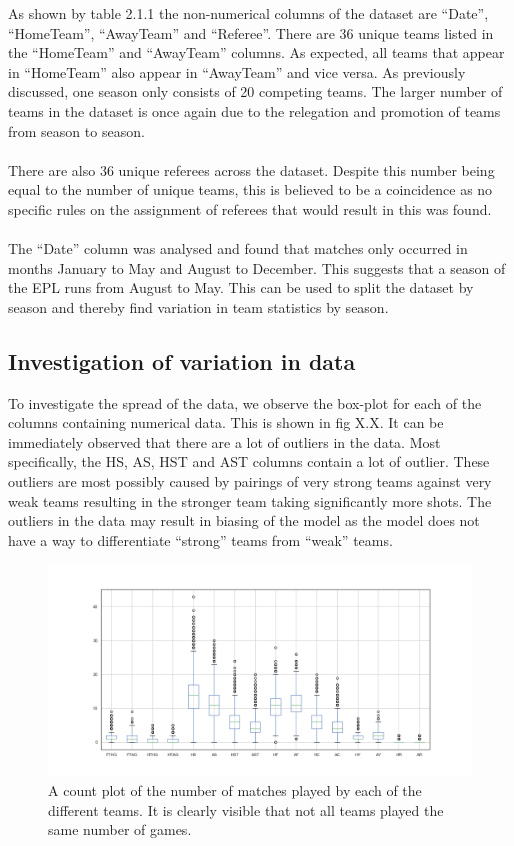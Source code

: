 \documentclass[a4paper,12pt]{article}
\begin{document}
	As shown by table 2.1.1 the non-numerical columns of the dataset are “Date”, “HomeTeam”, “AwayTeam” and “Referee”. There are 36 unique teams listed in the “HomeTeam” and “AwayTeam” columns. As expected, all teams that appear in “HomeTeam” also appear in “AwayTeam” and vice versa. As previously discussed, one season only consists of 20 competing teams. The larger number of teams in the dataset is once again due to the relegation and promotion of teams from season to season.\\
	\\
	There are also 36 unique referees across the dataset. Despite this number being equal to the number of unique teams, this is believed to be a coincidence as no specific rules on the assignment of referees that would result in this was found.\\
	\\
	The “Date” column was analysed and found that matches only occurred in months January to May and August to December. This suggests that a season of the EPL runs from August to May. This can be used to split the dataset by season and thereby find variation in team statistics by season.  
	
	\subsection{Investigation of variation in data}
	
	To investigate the spread of the data, we observe the box-plot for each of the columns containing numerical data. This is shown in fig X.X.  It can be immediately observed that there are a lot of outliers in the data. Most specifically, the HS, AS, HST and AST columns contain a lot of outlier. These outliers are most possibly caused by pairings of very strong teams against very weak teams resulting in the stronger team taking significantly more shots. The outliers in the data may result in biasing of the model as the model does not have a way to differentiate “strong” teams from “weak” teams. 
	
	\begin{figure}[H]
		\renewcommand\thefigure{2.3}
		\centering
		
		\includegraphics[scale=0.4]{raw_box_plot.png}
		\caption{A count plot of the number of matches played by each of the different teams. It is clearly visible that not all teams played the same number of games.}
	\end{figure}
	
\end{document}
